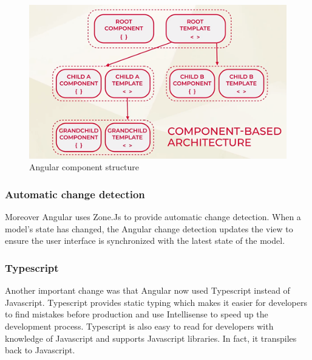 \begin{figure}[h!]
    \caption{Angular component structure}
    \centering
    \includegraphics[width=\textwidth]{img/angularcomponent.png} 
\end{figure}

\subsubsection{Automatic change detection}
Moreover Angular uses Zone.Js to provide automatic change detection. When a model's state has changed, the Angular change detection updates the view to ensure the user interface is synchronized with the latest state of the model.
\autocite{Kumar2020}

\subsubsection{Typescript}
Another important change was that Angular now used Typescript instead of Javascript. Typescript provides static typing which makes it easier for developers to find mistakes before production and use Intellisense to speed up the development process. Typescript is also easy to read for developers with knowledge of Javascript and supports Javascript libraries. In fact, it transpiles back to Javascript.
\autocite{Typescriptlang}

